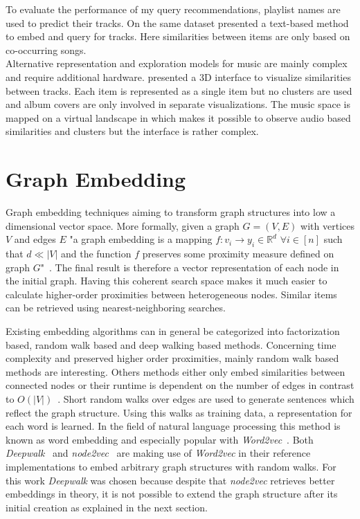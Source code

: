 \documentclass[sigconf]{acmart}
\begin{document}
To evaluate the performance of my query recommendations, playlist names are used to predict their tracks. On the same dataset \cite{chungexploiting} presented a text-based method to embed and query for tracks. Here similarities between items are only based on co-occurring songs. \\

Alternative representation and exploration models for music are mainly complex and require additional hardware. \cite{lamere2007using} presented a 3D interface to visualize similarities between tracks. Each item is represented as a single item but no clusters are used and album covers are only involved in separate visualizations. The music space is mapped on a virtual landscape in \cite{knees2007exploring} which makes it possible to observe audio based similarities and clusters but the interface is rather complex.

\section{Graph Embedding}
Graph embedding techniques aiming to transform graph structures into low a dimensional vector space. More formally, given a graph $ G = (V,E) $ with vertices $ V $ and edges $ E $ "a graph embedding is a mapping $ f : v_{i} \rightarrow y_{i} \in \mathbb{R}^{d} $ $ \forall i \in [n] $ such that $ d \ll |V| $ and the function $ f $ preserves some proximity measure defined on graph $ G $"~\cite{goyal2017graph}. The final result is therefore a vector representation of each node in the initial graph. Having this coherent search space makes it much easier to calculate higher-order proximities between heterogeneous nodes. Similar items can be retrieved using nearest-neighboring searches.

Existing embedding algorithms can in general be categorized into factorization based, random walk based and deep walking based methods. Concerning time complexity and preserved higher order proximities, mainly random walk based methods are interesting. Others methods either only embed similarities between connected nodes or their runtime is dependent on the number of edges in contrast to $ O(|V|) $~\cite{goyal2017graph}. Short random walks over edges are used to generate sentences which reflect the graph structure. Using this walks as training data, a representation for each word is learned. In the field of natural language processing this method is known as word embedding and especially popular with \emph{Word2vec}~\cite{mikolov2013efficient}. Both \emph{Deepwalk}~\cite{perozzi2014deepwalk} and \emph{node2vec}~\cite{grover2016node2vec} are making use of \emph{Word2vec} in their reference implementations to embed arbitrary graph structures with random walks. For this work \emph{Deepwalk} was chosen because despite that \emph{node2vec} retrieves better embeddings in theory, it is not possible to extend the graph structure after its initial creation as explained in the next section.
\end{document}
